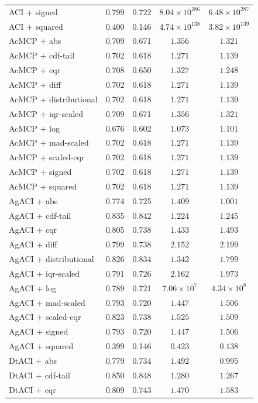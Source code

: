 \begin{longtable}{lcccc}
	ACI + signed & 0.799 & 0.722 & $8.04 \times 10^{286}$ & $6.48 \times 10^{287}$ \\
	ACI + squared & 0.400 & 0.146 & $4.74 \times 10^{138}$ & $3.82 \times 10^{139}$ \\
	AcMCP + abs & 0.709 & 0.671 & $1.356$ & $1.321$ \\
	AcMCP + cdf-tail & 0.702 & 0.618 & $1.271$ & $1.139$ \\
	AcMCP + cqr & 0.708 & 0.650 & $1.327$ & $1.248$ \\
	AcMCP + diff & 0.702 & 0.618 & $1.271$ & $1.139$ \\
	AcMCP + distributional & 0.702 & 0.618 & $1.271$ & $1.139$ \\
	AcMCP + iqr-scaled & 0.709 & 0.671 & $1.356$ & $1.321$ \\
	AcMCP + log & 0.676 & 0.602 & $1.073$ & $1.101$ \\
	AcMCP + mad-scaled & 0.702 & 0.618 & $1.271$ & $1.139$ \\
	AcMCP + scaled-cqr & 0.702 & 0.618 & $1.271$ & $1.139$ \\
	AcMCP + signed & 0.702 & 0.618 & $1.271$ & $1.139$ \\
	AcMCP + squared & 0.702 & 0.618 & $1.271$ & $1.139$ \\
	AgACI + abs & 0.774 & 0.725 & $1.409$ & $1.001$ \\
	AgACI + cdf-tail & 0.835 & 0.842 & $1.224$ & $1.245$ \\
	AgACI + cqr & 0.805 & 0.738 & $1.433$ & $1.493$ \\
	AgACI + diff & 0.799 & 0.738 & $2.152$ & $2.199$ \\
	AgACI + distributional & 0.826 & 0.834 & $1.342$ & $1.799$ \\
	AgACI + iqr-scaled & 0.791 & 0.726 & $2.162$ & $1.973$ \\
	AgACI + log & 0.789 & 0.721 & $7.06 \times 10^{7}$ & $4.34 \times 10^{8}$ \\
	AgACI + mad-scaled & 0.793 & 0.720 & $1.447$ & $1.506$ \\
	AgACI + scaled-cqr & 0.823 & 0.738 & $1.525$ & $1.509$ \\
	AgACI + signed & 0.793 & 0.720 & $1.447$ & $1.506$ \\
	AgACI + squared & 0.399 & 0.146 & $0.423$ & $0.138$ \\
	DtACI + abs & 0.779 & 0.734 & $1.492$ & $0.995$ \\
	DtACI + cdf-tail & 0.850 & 0.848 & $1.280$ & $1.267$ \\
	DtACI + cqr & 0.809 & 0.743 & $1.470$ & $1.583$ \\

\end{longtable}
